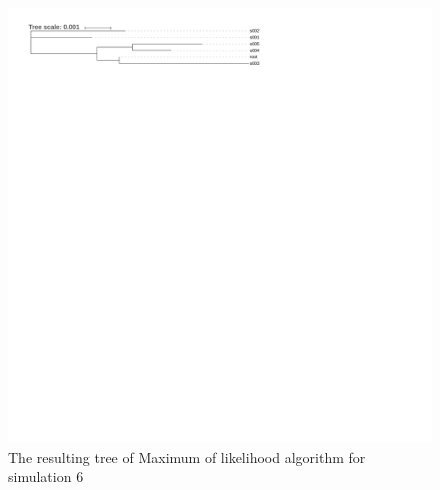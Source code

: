 \documentclass[]{article}
\theoremstyle{definition}
\begin{document}
\begin{figure}[H]
	\includegraphics*[width = \linewidth]{image/tree_6_MLGO.pdf}
	\caption{The resulting tree of Maximum of likelihood algorithm for simulation 6 }
\end{figure}
\end{document}

